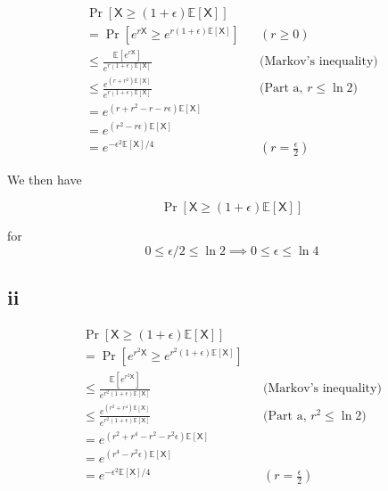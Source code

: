 \documentclass{article}
\newcommand{\E}{\mathbb{E}}
\newcommand{\rX}{\mathsf{X}}
\begin{document}


\begin{align}
    \Pr[\rX \geq (1+\epsilon)\E[\rX]]  \\
    = \Pr[e^{r\rX} \geq e^{r(1+\epsilon)\E[\rX]}] && (r \geq 0) \\
    \leq \frac{\E[e^{r\rX}]}{e^{r(1+\epsilon)\E[\rX]}} && \text{(Markov's inequality)} \\
    \leq \frac{e^{(r+r^2)\E[\rX]}}{e^{r(1+\epsilon)\E[\rX]}} && \text{({Part
    a, }}r \leq \ln 2) \\
    = e^{(r+r^2 - r - r\epsilon)\E[\rX]} \\
    = e^{(r^2 - r\epsilon)\E[\rX]} \\
    = e^{-\epsilon^2\E[\rX]/4} && (r = \frac{\epsilon}{2})
\end{align}

We then have 

$$\Pr[\rX \geq (1+\epsilon)\E[\rX]]$$

for $$0 \leq\epsilon/2 \leq \ln 2 \implies 0 \leq \epsilon \leq \ln 4$$

\subsection*{ii}

\begin{align}
    \Pr[\rX \geq (1+\epsilon)\E[\rX]]  \\
    = \Pr[e^{r^2\rX} \geq e^{r^2(1+\epsilon)\E[\rX]}] && \\
    \leq \frac{\E[e^{r^2\rX}]}{e^{r^2(1+\epsilon)\E[\rX]}} && \text{(Markov's inequality)} \\
    \leq \frac{e^{(r^2+r^4)\E[\rX]}}{e^{r^2(1+\epsilon)\E[\rX]}} && \text{({Part
    a, }}r^2 \leq \ln 2) \\
    = e^{(r^2+r^4 - r^2 - r^2\epsilon)\E[\rX]} \\
    = e^{(r^4 - r^2\epsilon)\E[\rX]} \\
    = e^{-\epsilon^2\E[\rX]/4} && (r = \frac{\epsilon}{2})
\end{align}
\end{document}

